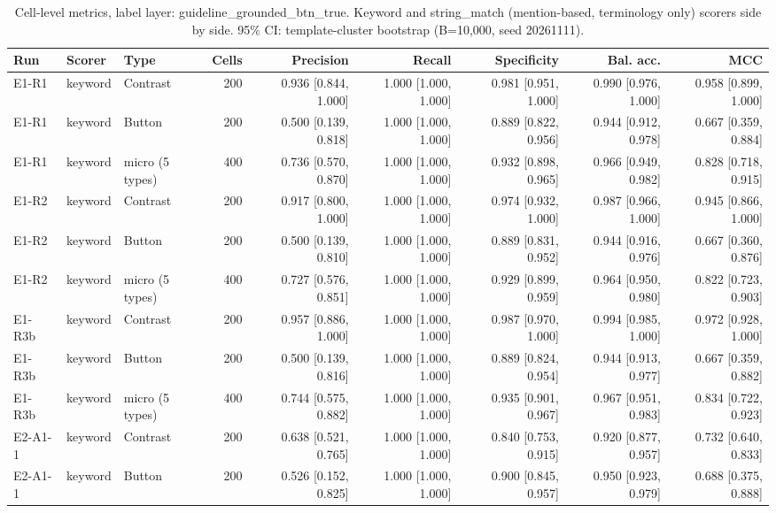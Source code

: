 \begin{table}[t]
\centering
\small
\caption{Cell-level metrics, label layer: guideline\_grounded\_btn\_true. Keyword and string\_match (mention-based, terminology only) scorers side by side. 95\% CI: template-cluster bootstrap (B=10,000, seed 20261111).}
\label{tab:e7-cells-guideline_grounded_btn_true}
\begin{tabular}{lllrrrrrr}
\toprule
Run & Scorer & Type & Cells & Precision & Recall & Specificity & Bal. acc. & MCC \\
\midrule
E1-R1 & keyword & Contrast & 200 & 0.936 [0.844, 1.000] & 1.000 [1.000, 1.000] & 0.981 [0.951, 1.000] & 0.990 [0.976, 1.000] & 0.958 [0.899, 1.000] \\
E1-R1 & keyword & Button & 200 & 0.500 [0.139, 0.818] & 1.000 [1.000, 1.000] & 0.889 [0.822, 0.956] & 0.944 [0.912, 0.978] & 0.667 [0.359, 0.884] \\
E1-R1 & keyword & micro (5 types) & 400 & 0.736 [0.570, 0.870] & 1.000 [1.000, 1.000] & 0.932 [0.898, 0.965] & 0.966 [0.949, 0.982] & 0.828 [0.718, 0.915] \\
E1-R2 & keyword & Contrast & 200 & 0.917 [0.800, 1.000] & 1.000 [1.000, 1.000] & 0.974 [0.932, 1.000] & 0.987 [0.966, 1.000] & 0.945 [0.866, 1.000] \\
E1-R2 & keyword & Button & 200 & 0.500 [0.139, 0.810] & 1.000 [1.000, 1.000] & 0.889 [0.831, 0.952] & 0.944 [0.916, 0.976] & 0.667 [0.360, 0.876] \\
E1-R2 & keyword & micro (5 types) & 400 & 0.727 [0.576, 0.851] & 1.000 [1.000, 1.000] & 0.929 [0.899, 0.959] & 0.964 [0.950, 0.980] & 0.822 [0.723, 0.903] \\
E1-R3b & keyword & Contrast & 200 & 0.957 [0.886, 1.000] & 1.000 [1.000, 1.000] & 0.987 [0.970, 1.000] & 0.994 [0.985, 1.000] & 0.972 [0.928, 1.000] \\
E1-R3b & keyword & Button & 200 & 0.500 [0.139, 0.816] & 1.000 [1.000, 1.000] & 0.889 [0.824, 0.954] & 0.944 [0.913, 0.977] & 0.667 [0.359, 0.882] \\
E1-R3b & keyword & micro (5 types) & 400 & 0.744 [0.575, 0.882] & 1.000 [1.000, 1.000] & 0.935 [0.901, 0.967] & 0.967 [0.951, 0.983] & 0.834 [0.722, 0.923] \\
E2-A1-1 & keyword & Contrast & 200 & 0.638 [0.521, 0.765] & 1.000 [1.000, 1.000] & 0.840 [0.753, 0.915] & 0.920 [0.877, 0.957] & 0.732 [0.640, 0.833] \\
E2-A1-1 & keyword & Button & 200 & 0.526 [0.152, 0.825] & 1.000 [1.000, 1.000] & 0.900 [0.845, 0.957] & 0.950 [0.923, 0.979] & 0.688 [0.375, 0.888] \\

\end{tabular}
\end{table}
